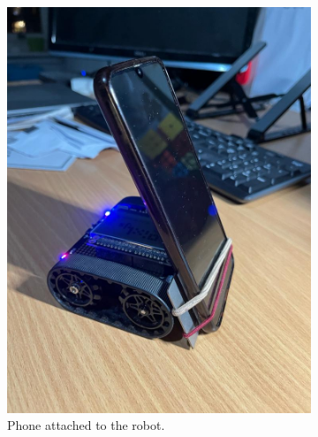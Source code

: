 \documentclass{l4proj}
\begin{document}
\begin{figure}[!h]
    \centering
    \begin{subfigure}{0.40\textwidth}
        \includegraphics[width=\textwidth]{images/phone-attachment-2.jpeg}
        \caption{Phone attached to the robot.}
        \label{fig:phone-attach}
    \end{subfigure}
    \begin{subfigure}{0.40\textwidth}

\end{subfigure}
\end{figure}
\end{document}
